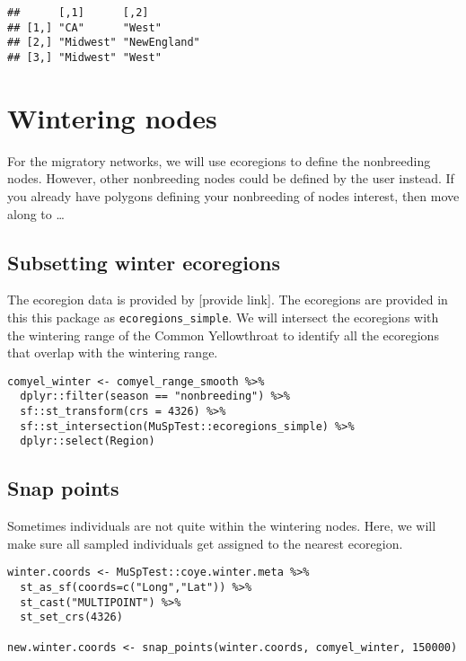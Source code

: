 \documentclass[
]{book}
\begin{document}
\begin{verbatim}
##      [,1]      [,2]        
## [1,] "CA"      "West"      
## [2,] "Midwest" "NewEngland"
## [3,] "Midwest" "West"
\end{verbatim}

\hypertarget{wintering}{%
\chapter{Wintering nodes}\label{wintering}}

For the migratory networks, we will use ecoregions to define the nonbreeding nodes. However, other nonbreeding nodes could be defined by the user instead. If you already have polygons defining your nonbreeding of nodes interest, then move along to \ldots{}

\hypertarget{subsetting-winter-ecoregions}{%
\section{Subsetting winter ecoregions}\label{subsetting-winter-ecoregions}}

The ecoregion data is provided by {[}provide link{]}. The ecoregions are provided in this this package as \texttt{ecoregions\_simple}. We will intersect the ecoregions with the wintering range of the Common Yellowthroat to identify all the ecoregions that overlap with the wintering range.

\begin{verbatim}
comyel_winter <- comyel_range_smooth %>%
  dplyr::filter(season == "nonbreeding") %>%
  sf::st_transform(crs = 4326) %>%
  sf::st_intersection(MuSpTest::ecoregions_simple) %>%
  dplyr::select(Region)
\end{verbatim}

\hypertarget{snap-points}{%
\section{Snap points}\label{snap-points}}

Sometimes individuals are not quite within the wintering nodes. Here, we will make sure all sampled individuals get assigned to the nearest ecoregion.

\begin{verbatim}
winter.coords <- MuSpTest::coye.winter.meta %>%
  st_as_sf(coords=c("Long","Lat")) %>%
  st_cast("MULTIPOINT") %>%
  st_set_crs(4326)
  
new.winter.coords <- snap_points(winter.coords, comyel_winter, 150000)
\end{verbatim}
\end{document}
